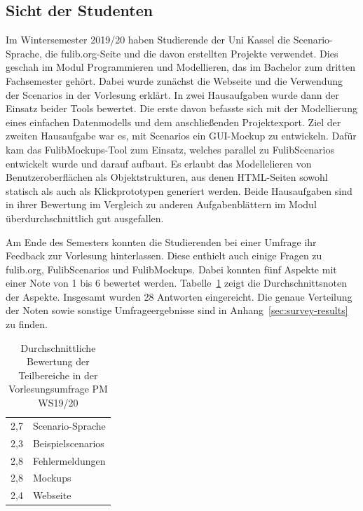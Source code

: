 \subsection{Sicht der Studenten}\label{subsec:students-view}

Im Wintersemester 2019/20 haben Studierende der Uni Kassel die Scenario-Sprache, die fulib.org-Seite und die davon erstellten Projekte verwendet.
Dies geschah im Modul Programmieren und Modellieren, das im Bachelor zum dritten Fachsemester gehört.
Dabei wurde zunächst die Webseite und die Verwendung der Scenarios in der Vorlesung erklärt.
In zwei Hausaufgaben wurde dann der Einsatz beider Tools bewertet.
Die erste davon befasste sich mit der Modellierung eines einfachen Datenmodells und dem anschließenden Projektexport.
Ziel der zweiten Hausaufgabe war es, mit Scenarios ein GUI-Mockup zu entwickeln.
Dafür kam das FulibMockups-Tool zum Einsatz, welches parallel zu FulibScenarios entwickelt wurde und darauf aufbaut.
Es erlaubt das Modellelieren von Benutzeroberflächen als Objektstrukturen,
aus denen HTML-Seiten sowohl statisch als auch als Klickprototypen generiert werden.
Beide Hausaufgaben sind in ihrer Bewertung im Vergleich zu anderen Aufgabenblättern im Modul überdurchschnittlich gut ausgefallen.

Am Ende des Semesters konnten die Studierenden bei einer Umfrage ihr Feedback zur Vorlesung hinterlassen.
Diese enthielt auch einige Fragen zu fulib.org, FulibScenarios und FulibMockups.
Dabei konnten fünf Aspekte mit einer Note von 1 bis 6 bewertet werden.
Tabelle~\ref{tab:survey-results} zeigt die Durchschnittsnoten der Aspekte.
Insgesamt wurden 28 Antworten eingereicht.
Die genaue Verteilung der Noten sowie sonstige Umfrageergebnisse sind in Anhang~\ref{sec:survey-results} zu finden.

\begin{table}
    \caption{Durchschnittliche Bewertung der Teilbereiche in der Vorlesungsumfrage PM WS19/20}
    \label{tab:survey-results}
    \centering
    \begin{tabular}{rl}
        \toprule
        2,7 & Scenario-Sprache \\
        2,3 & Beispielscenarios \\
        2,8 & Fehlermeldungen \\
        2,8 & Mockups \\
        2,4 & Webseite \\
        \bottomrule
    \end{tabular}
\end{table}


